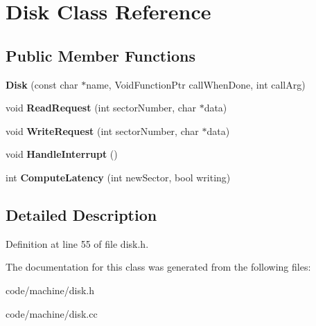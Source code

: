 \section{Disk Class Reference}
\label{class_disk}
\subsection*{Public Member Functions}
\begin{DoxyCompactItemize}
\item 
{\bfseries Disk} (const char $\ast$name, Void\+Function\+Ptr call\+When\+Done, int call\+Arg)\label{class_disk_a3e2ac7e4ca32bbec9b1acb015a4a71fa}

\item 
void {\bfseries Read\+Request} (int sector\+Number, char $\ast$data)\label{class_disk_a8b51a82d4f2fd009335d0c591ae11042}

\item 
void {\bfseries Write\+Request} (int sector\+Number, char $\ast$data)\label{class_disk_aec33797c6480a8c919fc7d340c316abe}

\item 
void {\bfseries Handle\+Interrupt} ()\label{class_disk_a32d4a38e61501c221163ef845b9d6969}

\item 
int {\bfseries Compute\+Latency} (int new\+Sector, bool writing)\label{class_disk_a2337b1c68eb5f6a15502d8327d15248b}

\end{DoxyCompactItemize}


\subsection{Detailed Description}


Definition at line 55 of file disk.\+h.



The documentation for this class was generated from the following files\+:\begin{DoxyCompactItemize}
\item 
code/machine/disk.\+h\item 
code/machine/disk.\+cc\end{DoxyCompactItemize}
